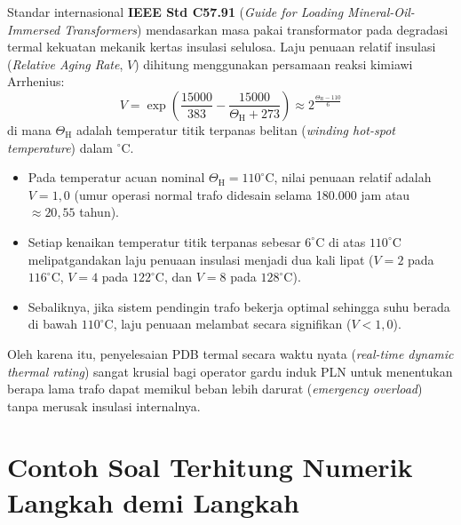 \documentclass[11pt,a4paper]{article}
\theoremstyle{definition}
\begin{document}
Standar internasional \textbf{IEEE Std C57.91} (\textit{Guide for Loading Mineral-Oil-Immersed Transformers}) mendasarkan masa pakai transformator pada degradasi termal kekuatan mekanik kertas insulasi selulosa. 
Laju penuaan relatif insulasi (\textit{Relative Aging Rate}, $V$) dihitung menggunakan persamaan reaksi kimiawi Arrhenius:
\begin{equation}
    V = \exp\left( \frac{15000}{383} - \frac{15000}{\Theta_{\text{H}} + 273} \right) \approx 2^{\frac{\Theta_{\text{H}} - 110}{6}}
    \label{eq:arrhenius_aging}
\end{equation}
di mana $\Theta_{\text{H}}$ adalah temperatur titik terpanas belitan (\textit{winding hot-spot temperature}) dalam $^\circ$C.
\begin{itemize}[leftmargin=*]
    \item Pada temperatur acuan nominal $\Theta_{\text{H}} = 110^\circ\text{C}$, nilai penuaan relatif adalah $V = 1{,}0$ (umur operasi normal trafo didesain selama 180.000 jam atau $\approx 20{,}55$ tahun).
    \item Setiap kenaikan temperatur titik terpanas sebesar $6^\circ\text{C}$ di atas $110^\circ\text{C}$ melipatgandakan laju penuaan insulasi menjadi dua kali lipat ($V = 2$ pada $116^\circ\text{C}$, $V = 4$ pada $122^\circ\text{C}$, dan $V = 8$ pada $128^\circ\text{C}$).
    \item Sebaliknya, jika sistem pendingin trafo bekerja optimal sehingga suhu berada di bawah $110^\circ\text{C}$, laju penuaan melambat secara signifikan ($V < 1{,}0$).
\end{itemize}

Oleh karena itu, penyelesaian PDB termal secara waktu nyata (\textit{real-time dynamic thermal rating}) sangat krusial bagi operator gardu induk PLN untuk menentukan berapa lama trafo dapat memikul beban lebih darurat (\textit{emergency overload}) tanpa merusak insulasi internalnya.

\section{Contoh Soal Terhitung Numerik Langkah demi Langkah}
\end{document}
